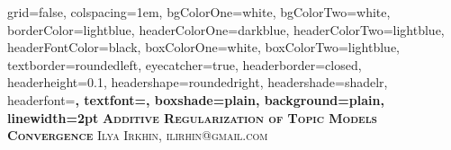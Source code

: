 \documentclass[portrait,final,a1paper,fontscale=0.401]{baposter}
\begin{document}
\begin{poster}%
  {
  grid=false,
  colspacing=1em,
  bgColorOne=white,
  bgColorTwo=white,
  borderColor=lightblue,
  headerColorOne=darkblue,
  headerColorTwo=lightblue,
  headerFontColor=black,
  boxColorOne=white,
  boxColorTwo=lightblue,
  textborder=roundedleft,
  eyecatcher=true,
  headerborder=closed,
  headerheight=0.1\textheight,
  headershape=roundedright,
  headershade=shadelr,
  headerfont=\Large\bf\textsc, %
  textfont={\setlength{\parindent}{0.5em}},
  boxshade=plain,
  background=plain,
  linewidth=2pt
  }
  {} 
  {\bf\textsc{Additive Regularization of Topic Models \\ Convergence}\vspace{0.5em}}
  {\textsc{Ilya Irkhin, ilirhin@gmail.com }}
  {%
  }

    
    \newcommand{\colouredcircle}{%
      \tikz{\useasboundingbox (-0.2em,-0.32em) rectangle(0.2em,0.32em); \draw[draw=headerColorOne,fill=lightblue,line width=0.03em] (0,0) circle(0.18em);}}



\end{poster}
\end{document}
